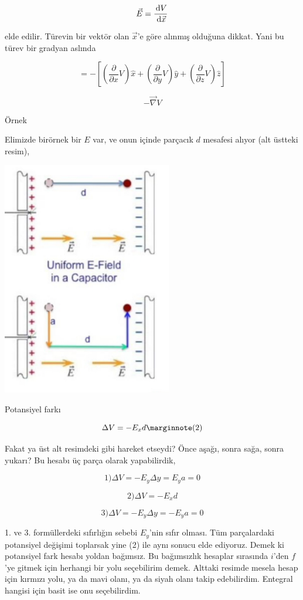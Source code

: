 \documentclass[12pt,fleqn]{article}\usepackage{../../common}
\begin{document}
$$
\vec{E} = \frac{\,\mathrm{d} V}{\,\mathrm{d} \vec{x}}
$$

elde edilir. Türevin bir vektör olan $\vec{x}$'e göre alınmış olduğuna
dikkat. Yani bu türev bir gradyan aslında

$$
= -\left[
  \left( \frac{\partial }{\partial x} V \right) \hat{x} + 
  \left( \frac{\partial }{\partial y} V \right) \hat{y} + 
  \left( \frac{\partial }{\partial z} V \right) \hat{z} 
  \right]
$$

$$
-\vec{\nabla} V
$$

Örnek

Elimizde birörnek bir $E$ var, ve onun içinde parçacık $d$ mesafesi alıyor (alt
üstteki resim),

\includegraphics[width=20em]{09_02.jpg}

Potansiyel farkı

$$
\Delta V = - E_x d 
\mlabel{2}
$$

Fakat ya üst alt resimdeki gibi hareket etseydi? Önce aşağı, sonra sağa, sonra
yukarı? Bu hesabı üç parça olarak yapabilirdik,

$$
1) \Delta V = -E_y \Delta y = E_y a = 0
$$

$$
2) \Delta V = -E_x d
$$

$$
3) \Delta V = -E_y \Delta y = -E_y a = 0
$$

1. ve 3. formüllerdeki sıfırlığın sebebi $E_y$'nin sıfır olması. Tüm
parçalardaki potansiyel değişimi toplarsak yine (2) ile aynı sonucu elde
ediyoruz. Demek ki potansiyel fark hesabı yoldan bağımsız. Bu bağımsızlık
hesaplar sırasında $i$'den $f$'ye gitmek için herhangi bir yolu seçebilirim
demek. Alttaki resimde mesela hesap için kırmızı yolu, ya da mavi olanı, ya da
siyah olanı takip edebilirdim. Entegral hangisi için basit ise onu seçebilirdim.
\end{document}
